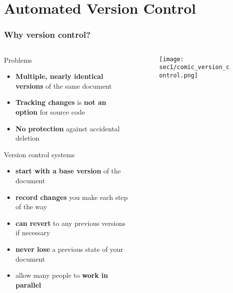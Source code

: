 \section{Automated Version Control}\hypertarget{sec1}{}
\setcounter{framenumber}{0}

\begin{frame}[fragile]
\frametitle{Why version control?}

  \begin{columns}

    \begin{column}{0.6\textwidth}
      Problems
      \begin{itemize}
        \small
        \item \textbf{Multiple, nearly identical versions} of the same document
        \item \textbf{Tracking changes} is \textbf{not an option} for source code
        \item \textbf{No protection} against accidental deletion
      \end{itemize}
      \vspace{0.15cm}
      Version control systems 
      \begin{itemize}
        \small
        \item \textbf{start with a base version} of the document
        \item \textbf{record changes} you make each step of the way
        \item \textbf{can revert} to any previous versions if necessary
        \item \textbf{never lose} a previous state of your document
        \item allow many people to \textbf{work in parallel}
      \end{itemize}
    \end{column}

    \begin{column}{0.4\textwidth}
    \begin{figure}[h]
    \texttt{[image: sec1/comic\_version\_control.png]}
    \end{figure}
    \end{column}

  \end{columns}

\end{frame}

